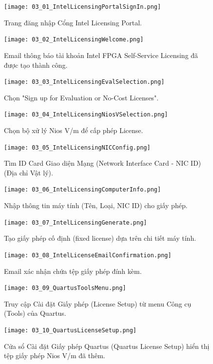 \begin{figure}[htbp] \centering \texttt{[image: 03\_01\_IntelLicensingPortalSignIn.png]} \caption{Trang đăng nhập Cổng Intel Licensing Portal.} \label{fig:03_01} \end{figure}
\begin{figure}[htbp] \centering \texttt{[image: 03\_02\_IntelLicensingWelcome.png]} \caption{Email thông báo tài khoản Intel FPGA Self-Service Licensing đã được tạo thành công.} \label{fig:03_02} \end{figure}
\begin{figure}[htbp] \centering \texttt{[image: 03\_03\_IntelLicensingEvalSelection.png]} \caption{Chọn "Sign up for Evaluation or No-Cost Licenses".} \label{fig:03_03} \end{figure}
\begin{figure}[htbp] \centering \texttt{[image: 03\_04\_IntelLicensingNiosVSelection.png]} \caption{Chọn bộ xử lý Nios V/m để cấp phép License.} \label{fig:03_04} \end{figure}
\begin{figure}[htbp] \centering \texttt{[image: 03\_05\_IntelLicensingNICConfig.png]} \caption{Tìm ID Card Giao diện Mạng (Network Interface Card - NIC ID) (Địa chỉ Vật lý).} \label{fig:03_05} \end{figure}
\begin{figure}[htbp] \centering \texttt{[image: 03\_06\_IntelLicensingComputerInfo.png]} \caption{Nhập thông tin máy tính (Tên, Loại, NIC ID) cho giấy phép.} \label{fig:03_06} \end{figure}
\begin{figure}[htbp] \centering \texttt{[image: 03\_07\_IntelLicensingGenerate.png]} \caption{Tạo giấy phép cố định (fixed license) dựa trên chi tiết máy tính.} \label{fig:03_07} \end{figure}
\begin{figure}[htbp] \centering \texttt{[image: 03\_08\_IntelLicenseEmailConfirmation.png]} \caption{Email xác nhận chứa tệp giấy phép đính kèm.} \label{fig:03_08} \end{figure}
\begin{figure}[htbp] \centering \texttt{[image: 03\_09\_QuartusToolsMenu.png]} \caption{Truy cập Cài đặt Giấy phép (License Setup) từ menu Công cụ (Tools) của Quartus.} \label{fig:03_09} \end{figure}
\begin{figure}[htbp] \centering \texttt{[image: 03\_10\_QuartusLicenseSetup.png]} \caption{Cửa sổ Cài đặt Giấy phép Quartus (Quartus License Setup) hiển thị tệp giấy phép Nios V/m đã thêm.} \label{fig:03_10} \end{figure}

